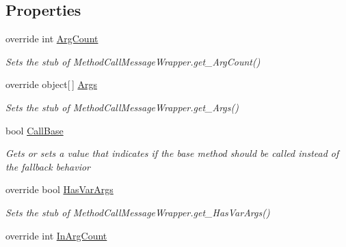 \subsection*{Properties}
\begin{DoxyCompactItemize}
\item 
override int \hyperlink{class_system_1_1_runtime_1_1_remoting_1_1_messaging_1_1_fakes_1_1_stub_method_call_message_wrapper_a4d7ea520a918b028b1b64a5aea464d86}{Arg\-Count}
\begin{DoxyCompactList}\small\item\em Sets the stub of Method\-Call\-Message\-Wrapper.\-get\-\_\-\-Arg\-Count()\end{DoxyCompactList}\item 
override object\mbox{[}$\,$\mbox{]} \hyperlink{class_system_1_1_runtime_1_1_remoting_1_1_messaging_1_1_fakes_1_1_stub_method_call_message_wrapper_a0bf359c84d6c8f48bc5356621aacf392}{Args}
\begin{DoxyCompactList}\small\item\em Sets the stub of Method\-Call\-Message\-Wrapper.\-get\-\_\-\-Args()\end{DoxyCompactList}\item 
bool \hyperlink{class_system_1_1_runtime_1_1_remoting_1_1_messaging_1_1_fakes_1_1_stub_method_call_message_wrapper_aaa9d4112f56cd2beb66b8f790547c21e}{Call\-Base}
\begin{DoxyCompactList}\small\item\em Gets or sets a value that indicates if the base method should be called instead of the fallback behavior\end{DoxyCompactList}\item 
override bool \hyperlink{class_system_1_1_runtime_1_1_remoting_1_1_messaging_1_1_fakes_1_1_stub_method_call_message_wrapper_a1126f8768119815e50864602638cf224}{Has\-Var\-Args}
\begin{DoxyCompactList}\small\item\em Sets the stub of Method\-Call\-Message\-Wrapper.\-get\-\_\-\-Has\-Var\-Args()\end{DoxyCompactList}\item 
override int \hyperlink{class_system_1_1_runtime_1_1_remoting_1_1_messaging_1_1_fakes_1_1_stub_method_call_message_wrapper_abd1d31ba5d16ee2bff5ee0547c5b97b6}{In\-Arg\-Count}

\end{DoxyCompactItemize}
